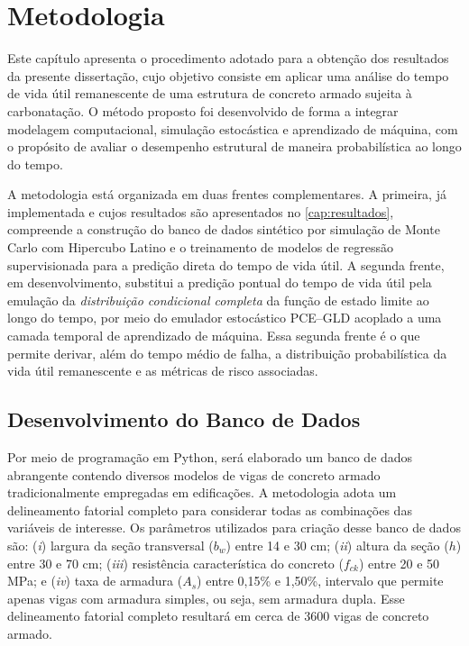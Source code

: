 \chapter{Metodologia} \label{met}

Este capítulo apresenta o procedimento adotado para a obtenção dos resultados da presente dissertação, cujo objetivo consiste em aplicar uma análise do tempo de vida útil remanescente de uma estrutura de concreto armado sujeita à carbonatação. O método proposto foi desenvolvido de forma a integrar modelagem computacional, simulação estocástica e aprendizado de máquina, com o propósito de avaliar o desempenho estrutural de maneira probabilística ao longo do tempo.

A metodologia está organizada em duas frentes complementares. A primeira, já implementada e cujos resultados são apresentados no \autoref{cap:resultados}, compreende a construção do banco de dados sintético por simulação de Monte Carlo com Hipercubo Latino e o treinamento de modelos de regressão supervisionada para a predição direta do tempo de vida útil. A segunda frente, em desenvolvimento, substitui a predição pontual do tempo de vida útil pela emulação da \textit{distribuição condicional completa} da função de estado limite ao longo do tempo, por meio do emulador estocástico PCE--GLD acoplado a uma camada temporal de aprendizado de máquina. Essa segunda frente é o que permite derivar, além do tempo médio de falha, a distribuição probabilística da vida útil remanescente e as métricas de risco associadas.

\section{Desenvolvimento do Banco de Dados}

Por meio de programação em Python, será elaborado um banco de dados abrangente contendo diversos modelos de vigas de concreto armado tradicionalmente empregadas em edificações. A metodologia adota um delineamento fatorial completo para considerar todas as combinações das variáveis de interesse. Os parâmetros utilizados para criação desse banco de dados são: (\textit{i}) largura da seção transversal ($b_w$) entre 14 e 30 cm; (\textit{ii}) altura da seção ($h$) entre 30 e 70 cm; (\textit{iii}) resistência característica do concreto ($f_{ck}$) entre 20 e 50 MPa; e (\textit{iv}) taxa de armadura ($A_s$) entre 0,15\% e 1,50\%, intervalo que permite apenas vigas com armadura simples, ou seja, sem armadura dupla. Esse delineamento fatorial completo resultará em cerca de 3600 vigas de concreto armado.

